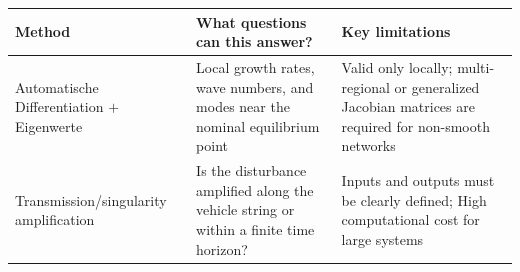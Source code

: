 \documentclass[11pt,a4paper,openany]{book}
\numberwithin{equation}{chapter}
\numberwithin{figure}{chapter}
\numberwithin{table}{chapter}
\begin{document}
\begin{center}
\small
{}
\label{tab:ml-certification-methods}
\begin{tabular}{p{3.0cm}p{5.0cm}p{6.1cm}}
\toprule
\textbf{Method} & \textbf{What questions can this answer?} & \textbf{Key limitations} \\
\midrule







Automatische Differentiation $+$ Eigenwerte




&






Local growth rates, wave numbers, and modes near the nominal equilibrium point






&






Valid only locally; multi-regional or generalized Jacobian matrices are required for non-smooth networks





\\









Transmission/singularity amplification






&






Is the disturbance amplified along the vehicle string or within a finite time horizon?






&






Inputs and outputs must be clearly defined; High computational cost for large systems





\\










\end{tabular}
\end{center}
\end{document}

